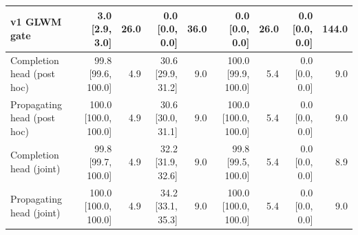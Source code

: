 \begin{tabular}{lrrrrrrrr}
v1 GLWM gate & 3.0 \tiny{[2.9, 3.0]} & 26.0 & 0.0 \tiny{[0.0, 0.0]} & 36.0 & 0.0 \tiny{[0.0, 0.0]} & 26.0 & 0.0 \tiny{[0.0, 0.0]} & 144.0 \\
\midrule
Completion head (post hoc) & 99.8 \tiny{[99.6, 100.0]} & 4.9 & 30.6 \tiny{[29.9, 31.2]} & 9.0 & 100.0 \tiny{[99.9, 100.0]} & 5.4 & 0.0 \tiny{[0.0, 0.0]} & 9.0 \\
Propagating head (post hoc) & 100.0 \tiny{[100.0, 100.0]} & 4.9 & 30.6 \tiny{[30.0, 31.1]} & 9.0 & 100.0 \tiny{[100.0, 100.0]} & 5.4 & 0.0 \tiny{[0.0, 0.0]} & 9.0 \\
Completion head (joint) & 99.8 \tiny{[99.7, 100.0]} & 4.9 & 32.2 \tiny{[31.9, 32.6]} & 9.0 & 99.8 \tiny{[99.5, 100.0]} & 5.4 & 0.0 \tiny{[0.0, 0.0]} & 8.9 \\
Propagating head (joint) & 100.0 \tiny{[100.0, 100.0]} & 4.9 & 34.2 \tiny{[33.1, 35.3]} & 9.0 & 100.0 \tiny{[100.0, 100.0]} & 5.4 & 0.0 \tiny{[0.0, 0.0]} & 9.0 \\
\bottomrule
\end{tabular}